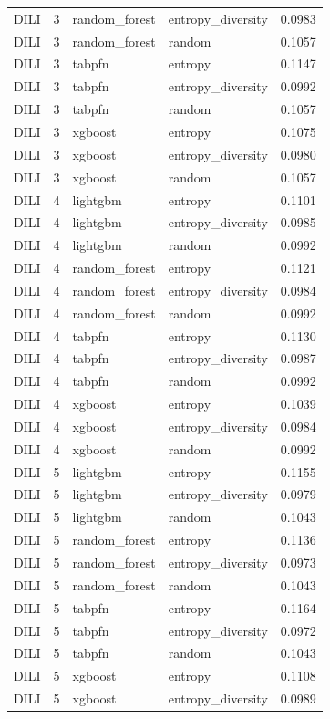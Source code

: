 \begin{tabular}{lrllr}
DILI & 3 & random_forest & entropy_diversity & 0.0983 \\
DILI & 3 & random_forest & random & 0.1057 \\
DILI & 3 & tabpfn & entropy & 0.1147 \\
DILI & 3 & tabpfn & entropy_diversity & 0.0992 \\
DILI & 3 & tabpfn & random & 0.1057 \\
DILI & 3 & xgboost & entropy & 0.1075 \\
DILI & 3 & xgboost & entropy_diversity & 0.0980 \\
DILI & 3 & xgboost & random & 0.1057 \\
DILI & 4 & lightgbm & entropy & 0.1101 \\
DILI & 4 & lightgbm & entropy_diversity & 0.0985 \\
DILI & 4 & lightgbm & random & 0.0992 \\
DILI & 4 & random_forest & entropy & 0.1121 \\
DILI & 4 & random_forest & entropy_diversity & 0.0984 \\
DILI & 4 & random_forest & random & 0.0992 \\
DILI & 4 & tabpfn & entropy & 0.1130 \\
DILI & 4 & tabpfn & entropy_diversity & 0.0987 \\
DILI & 4 & tabpfn & random & 0.0992 \\
DILI & 4 & xgboost & entropy & 0.1039 \\
DILI & 4 & xgboost & entropy_diversity & 0.0984 \\
DILI & 4 & xgboost & random & 0.0992 \\
DILI & 5 & lightgbm & entropy & 0.1155 \\
DILI & 5 & lightgbm & entropy_diversity & 0.0979 \\
DILI & 5 & lightgbm & random & 0.1043 \\
DILI & 5 & random_forest & entropy & 0.1136 \\
DILI & 5 & random_forest & entropy_diversity & 0.0973 \\
DILI & 5 & random_forest & random & 0.1043 \\
DILI & 5 & tabpfn & entropy & 0.1164 \\
DILI & 5 & tabpfn & entropy_diversity & 0.0972 \\
DILI & 5 & tabpfn & random & 0.1043 \\
DILI & 5 & xgboost & entropy & 0.1108 \\
DILI & 5 & xgboost & entropy_diversity & 0.0989 \\

\end{tabular}
